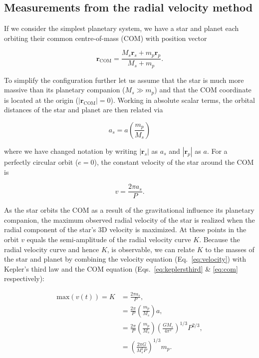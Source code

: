 \subsection{Measurements from the radial velocity method} \label{sect:K}
If we consider the simplest planetary system, we have a star and planet each 
orbiting their common centre-of-mass (COM) with position vector

\begin{equation}
\mathbf{r}_{\mathrm{COM}} = \frac{M_s \mathbf{r}_s + m_p \mathbf{r}_p}{M_s + m_p}.
\end{equation}

\noindent To simplify the configuration further let us assume that the star is 
much more massive than its planetary companion ($M_s \gg m_p$) and that the 
COM coordinate is located at the origin ($|\mathbf{r}_{\mathrm{COM}}|=0$). Working 
in absolute scalar terms, the orbital distances of the star and planet are then 
related via 

\begin{equation}
a_s = a \left( \frac{m_p}{M_s} \right)
\label{eq:com}
\end{equation}
  
\noindent where we have changed notation by writing $|\mathbf{r}_s|$ as $a_s$ and 
$|\mathbf{r}_p|$ as $a$. For a perfectly circular orbit ($e=0$), the constant 
velocity of the star around the COM is 

\begin{equation}
v = \frac{2\pi a_s}{P}.
\label{eq:velocity}
\end{equation}

\noindent As the star orbits the COM as a result of the gravitational influence its 
planetary companion, the maximum observed radial velocity of the star is realized 
when the radial component of the star's 3D 
velocity is maximized. At these points in the orbit $v$ equals the semi-amplitude 
of the radial velocity curve $K$. Because the radial velocity 
curve and hence $K$, is observable, 
we can relate $K$ to the masses of the star and planet by combining the velocity 
equation (Eq.~\ref{eq:velocity}) with Kepler's third law and the COM equation 
(Eqs.~\ref{eq:keplersthird} \& \ref{eq:com} respectively):

\begin{align}
\mathrm{max}(v(t)) = K &= \frac{2\pi a_s}{P}, \\
&= \frac{2\pi}{P} \left( \frac{m_p}{M_s} \right) a, \\
&= \frac{2\pi}{P} \left( \frac{m_p}{M_s} \right) \left( \frac{GM_s}{4\pi^2} \right)^{1/3} P^{2/3}, \\
&= \left( \frac{2\pi G}{M_s^2 P} \right)^{1/3} m_p. \label{eq:K1}
\end{align}

